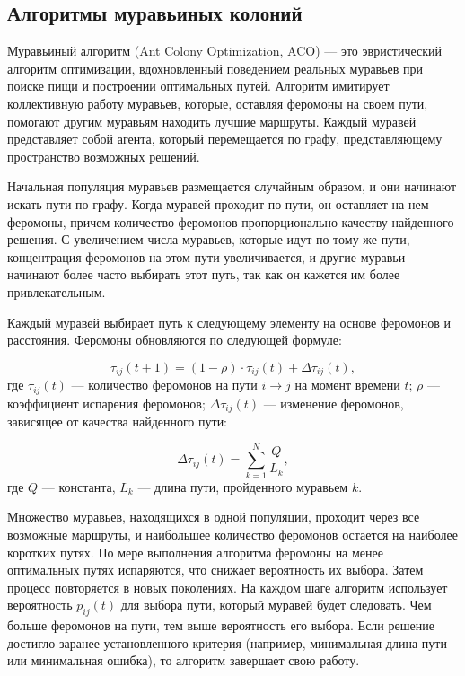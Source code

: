\subsection{Алгоритмы муравьиных колоний}
Муравьиный алгоритм (Ant Colony Optimization, ACO) — это эвристический алгоритм оптимизации, вдохновленный поведением реальных муравьев при поиске пищи и построении оптимальных путей. Алгоритм имитирует коллективную работу муравьев, которые, оставляя феромоны на своем пути, помогают другим муравьям находить лучшие маршруты. Каждый муравей представляет собой агента, который перемещается по графу, представляющему пространство возможных решений\cite{ant}.

Начальная популяция муравьев размещается случайным образом, и они начинают искать пути по графу. Когда муравей проходит по пути, он оставляет на нем феромоны, причем количество феромонов пропорционально качеству найденного решения. С увеличением числа муравьев, которые идут по тому же пути, концентрация феромонов на этом пути увеличивается, и другие муравьи начинают более часто выбирать этот путь, так как он кажется им более привлекательным.

Каждый муравей выбирает путь к следующему элементу на основе феромонов и расстояния. Феромоны обновляются по следующей формуле:

\begin{equation}
\tau_{ij}(t+1) = (1 - \rho) \cdot \tau_{ij}(t) + \Delta \tau_{ij}(t),
\end{equation}
где \( \tau_{ij}(t) \) --- количество феромонов на пути \(i \to j\) на момент времени \(t\); \( \rho \) — коэффициент испарения феромонов; \( \Delta \tau_{ij}(t) \) — изменение феромонов, зависящее от качества найденного пути:

\begin{equation}
\Delta \tau_{ij}(t) = \sum_{k=1}^{N} \frac{Q}{L_k},
\end{equation}
где \( Q \) --- константа, \( L_k \) --- длина пути, пройденного муравьем \(k\).

Множество муравьев, находящихся в одной популяции, проходит через все возможные маршруты, и наибольшее количество феромонов остается на наиболее коротких путях.
По мере выполнения алгоритма феромоны на менее оптимальных путях испаряются, что снижает вероятность их выбора. Затем процесс повторяется в новых поколениях. На каждом шаге алгоритм использует вероятность \( p_{ij}(t) \) для выбора пути, который муравей будет следовать. Чем больше феромонов на пути, тем выше вероятность его выбора. Если решение достигло заранее установленного критерия (например, минимальная длина пути или минимальная ошибка), то алгоритм завершает свою работу.

